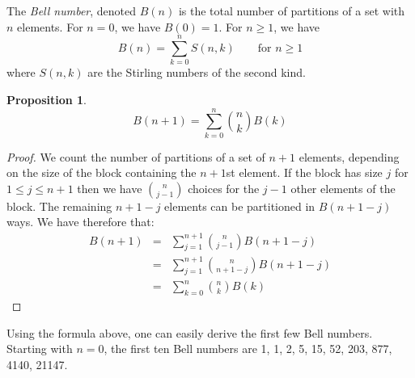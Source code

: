 \documentclass[12pt]{article}
\begin{document}
The \emph{Bell number}, denoted $B(n)$ is the total number of partitions of a set with $n$ elements.  For $n=0$, we have $B(0)=1$.  For $n\ge 1$, we have 
\[
B(n) = \sum_{k=0}^n S(n,k) \qquad \textrm{for } n \ge 1
\]
where $S(n,k)$ are the Stirling numbers of the second kind.

\newtheorem{bell}{Proposition}
\begin{bell}
\[
B(n+1) = \sum_{k=0}^n \binom{n}{k} B(k)
\]
\end{bell}

\begin{proof}
We count the number of partitions of a set of $n+1$ elements, depending on the size of the block containing the $n+1$st element. If the block has size $j$ for $1 \le j \le n+1$ then we have $\binom{n}{j-1}$ choices for the $j-1$ other elements of the block. The remaining $n+1-j$ elements can be partitioned in $B(n+1-j)$ ways. We have therefore that:
\begin{eqnarray*}
B(n+1) & = & \sum_{j=1}^{n+1}\binom{n}{j-1} B(n+1-j) \\
       & = & \sum_{j=1}^{n+1}\binom{n}{n+1-j} B(n+1-j) \\
       & = & \sum_{k=0}^n \binom{n}{k} B(k)
\end{eqnarray*}
\end{proof}

Using the formula above, one can easily derive the first few Bell numbers.  Starting with $n=0$, the first ten Bell numbers are 1, 1, 2, 5, 15, 52, 203, 877, 4140, 21147.

\end{document}

